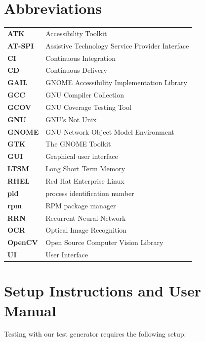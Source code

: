 
\chapter{Abbreviations}
\renewcommand{\arraystretch}{1.2}
\begin{tabular}{lp{12cm}}%
\textbf{ATK} & Accessibility Toolkit \\
\textbf{AT-SPI} & Assistive Technology Service Provider Interface \\
\textbf{CI} & Continuous Integration \\
\textbf{CD} & Continuous Delivery \\
\textbf{GAIL} & GNOME Accessibility Implementation Library \\
\textbf{GCC} & GNU Compiler Collection \\
\textbf{GCOV} & GNU Coverage Testing Tool \\
\textbf{GNU} & GNU's Not Unix \\
\textbf{GNOME} & GNU Network Object Model Environment \\
\textbf{GTK} & The GNOME Toolkit \\
\textbf{GUI} & Graphical user interface \\
\textbf{LTSM} & Long Short Term Memory \\
\textbf{RHEL} & Red Hat Enterprise Linux \\
\textbf{pid} & process identification number \\
\textbf{rpm} & RPM package manager \\
\textbf{RRN} & Recurrent Neural Network \\
\textbf{OCR} & Optical Image Recognition \\
\textbf{OpenCV} & Open Source Computer Vision Library \\
\textbf{UI} & User Interface \\
\end{tabular}

\chapter{Setup Instructions and User Manual}\label{manual}

Testing with our test generator requires the following setup:

